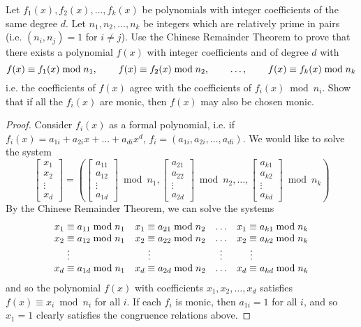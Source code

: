 \documentclass[12pt,leqno]{book}
\numberwithin{equation}{section}
\newcommand{\question}[2] {\vspace{.25in}\noindent\fbox{#1} #2 \vspace{.10in}}
\theoremstyle{definition}
\begin{document}
\question{6}{Let $f_1(x),f_2(x),\hdots,f_k(x)$ be polynomials with integer coefficients of the same degree $d$. Let $n_1,n_2,\hdots,n_k$ be integers which are relatively prime in pairs (i.e. $(n_i,n_j)=1$ for $i\not=j$). Use the Chinese Remainder Theorem to prove that there exists a polynomial $f(x)$ with integer coefficients and of degree $d$ with\[f(x)\equiv f_1(x)\bmod{n_1},\hskip.3in f(x)\equiv f_2(x)\bmod{n_2},\hskip.3in\hdots,\hskip.3in f(x)\equiv f_k(x)\bmod{n_k}\] i.e. the coefficients of $f(x)$ agree with the coefficients of $f_i(x)\bmod{n_i}$. Show that if all the $f_i(x)$ are monic, then $f(x)$ may also be chosen monic.}

\begin{proof}
 Consider $f_i(x)$ as a formal polynomial, i.e. if $f_i(x)=a_{1i}+a_{2i}x+\hdots+a_{di}x^d$, $f_i=(a_{1i},a_{2i},\hdots,a_{di})$. We would like to solve the system \[\begin{bmatrix}x_1\\x_2\\\vdots\\x_d\end{bmatrix}=\left(\begin{bmatrix}a_{11}\\a_{12}\\\vdots\\a_{1d}\end{bmatrix}\bmod{n_1},\begin{bmatrix}a_{21}\\a_{22}\\\vdots\\a_{2d}\end{bmatrix}\bmod{n_2},\hdots,\begin{bmatrix}a_{k1}\\a_{k2}\\\vdots\\a_{kd}\end{bmatrix}\bmod{n_k}\right)\] By the Chinese Remainder Theorem, we can solve the systems \[\begin{array}{cccc}x_1\equiv a_{11}\bmod{n_1} & x_1\equiv a_{21}\bmod{n_2} & \hdots & x_1\equiv a_{k1}\bmod{n_k}\\x_2\equiv a_{12}\bmod{n_1} & x_2\equiv a_{22}\bmod{n_2} & \hdots & x_2\equiv a_{k2}\bmod{n_k}\\\hskip-.6in\vdots & \hskip-.6in\vdots & \vdots & \hskip-.6in\vdots\\x_d\equiv a_{1d}\bmod{n_1}& x_d\equiv a_{2d}\bmod{n_2} & \hdots & x_d\equiv a_{kd}\bmod{n_k}\end{array}\] and so the polynomial $f(x)$ with coefficients $x_1,x_2,\hdots,x_d$ satisfies $f(x)\equiv x_i\bmod{n_i}$ for all $i$. If each $f_i$ is monic, then $a_{1i}=1$ for all $i$, and so $x_1=1$ clearly satisfies the congruence relations above.
\end{proof}
\end{document}
